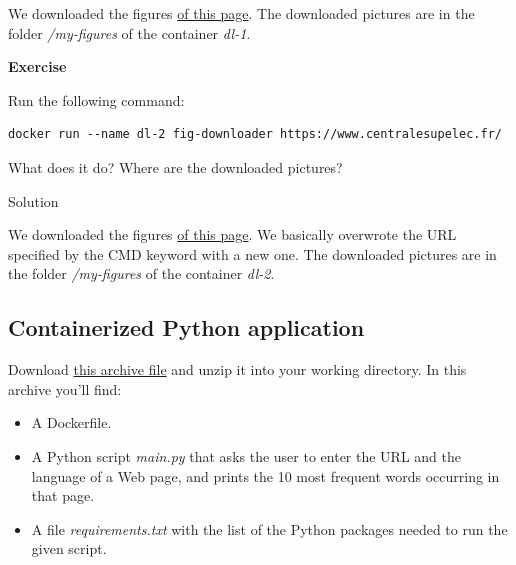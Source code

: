 \documentclass[
]{article}
\providecommand{\tightlist}{%
  \setlength{\itemsep}{0pt}\setlength{\parskip}{0pt}}
\newenvironment{infobox}[1]
  {
  \begin{itemize}
  \renewcommand{\labelitemi}{
    \raisebox{-.7\height}[0pt][0pt]{
      
    }
  }
  \setlength{\fboxsep}{1em}
  \begin{whitebox}
  \item
  }
  {
  \end{whitebox}
  \end{itemize}
  }
\theoremstyle{definition}
\theoremstyle{definition}
\theoremstyle{definition}
\theoremstyle{remark}
\let\BeginKnitrBlock\begin \let\EndKnitrBlock\end
\begin{document}
\begin{infobox}{exercisebox}
We downloaded the figures
\href{https://www.centralesupelec.fr/fr/presentation}{of this page}.
The downloaded pictures are in the folder \emph{/my-figures}
of the container \emph{dl-1}.

\end{infobox}

\begin{infobox}{exercisebox}

\textbf{Exercise}

\BeginKnitrBlock{exercise}
\label{exr:unnamed-chunk-18}{\label{exr:unnamed-chunk-18} }Run the following command:

\begin{verbatim}
docker run --name dl-2 fig-downloader https://www.centralesupelec.fr/
\end{verbatim}

What does it do? Where are the downloaded pictures?
\EndKnitrBlock{exercise}

\end{infobox}

Solution

\begin{infobox}{exercisebox}
We downloaded the figures
\href{https://www.centralesupelec.fr}{of this page}.
We basically overwrote the URL specified by the CMD keyword with a new
one.
The downloaded pictures are in the folder \emph{/my-figures}
of the container \emph{dl-2}.

\end{infobox}

\subsection{Containerized Python application}\label{containerized-python-application}

Download \href{/courses/cloud-computing/tutorial-docker/word-frequency.zip}{this archive file}
and unzip it into your working directory.
In this archive you'll find:

\begin{itemize}
\tightlist
\item
  A Dockerfile.
\item
  A Python script \emph{main.py} that asks the user to enter the URL and the language of a Web page,
  and prints the 10 most frequent words occurring in that page.
\item
  A file \emph{requirements.txt} with the list of the Python packages
  needed to run the given script.
\end{itemize}
\end{document}
